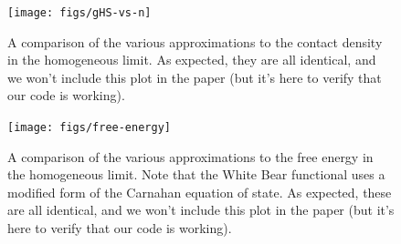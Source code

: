\documentclass[letterpaper,twocolumn,amsmath,amssymb,jcp,10pt,aip]{revtex4-1}
\begin{document}
\appendix

\begin{figure}
\texttt{[image: figs/gHS-vs-n]}
\caption{A comparison of the various approximations to the contact
  density in the homogeneous limit.  As expected, they are all
  identical, and we won't include this plot in the paper (but it's
  here to verify that our code is working).}
\label{fig:gHS-vs-n}
\end{figure}

\begin{figure}
\texttt{[image: figs/free-energy]}
\caption{A comparison of the various approximations to the free energy
  in the homogeneous limit.  Note that the White Bear functional uses
  a modified form of the Carnahan equation of state.  As expected,
  these are all identical, and we won't include this plot in the paper
  (but it's here to verify that our code is working).}
\label{fig:free-energy}
\end{figure}
\end{document}
